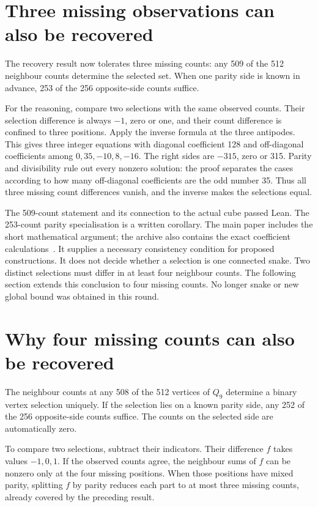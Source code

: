 \documentclass[11pt,a4paper]{article}
\begin{document}
\section{Three missing observations can also be recovered}
The recovery result now tolerates three missing counts: any 509 of the
512 neighbour counts determine the selected set. When one parity side
is known in advance, 253 of the 256 opposite-side counts suffice.

For the reasoning, compare two selections with the same observed
counts. Their selection difference is always $-1$, zero or one, and
their count difference is confined to three positions. Apply the inverse
formula at the three antipodes. This gives three integer equations with
diagonal coefficient 128 and off-diagonal coefficients among
$0,35,-10,8,-16$. The right sides are $-315$, zero or 315.
Parity and divisibility rule out every nonzero solution: the proof
separates the cases according to how many off-diagonal coefficients are
the odd number 35. Thus all three missing count differences vanish,
and the inverse makes the selections equal.

The 509-count statement and its connection to the actual cube passed
Lean. The 253-count parity specialisation is a written corollary.
The main paper includes the short mathematical argument; the archive
also contains the exact coefficient calculations~\cite{research238}.
It supplies a necessary consistency condition for proposed constructions.
It does not decide whether a selection is one connected snake.
Two distinct selections must differ in at least four neighbour counts.
The following section extends this conclusion to four missing counts.
No longer snake or new global bound was obtained in this round.

\section{Why four missing counts can also be recovered}
The neighbour counts at any 508 of the 512 vertices of $Q_9$ determine
a binary vertex selection uniquely. If the selection lies on a known
parity side, any 252 of the 256 opposite-side counts suffice. The counts
on the selected side are automatically zero.

To compare two selections, subtract their indicators. Their difference
$f$ takes values $-1,0,1$. If the observed counts agree, the neighbour
sums of $f$ can be nonzero only at the four missing positions. When
those positions have mixed parity, splitting $f$ by parity reduces
each part to at most three missing counts, already covered by the
preceding result.
\end{document}
